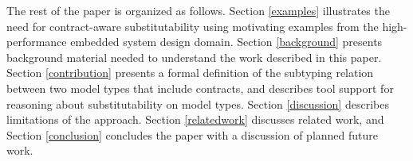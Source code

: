The rest of the paper is organized as follows. 
Section \ref{examples} illustrates the need for contract-aware substitutability using motivating examples from the high-performance 
embedded system design domain.
Section \ref{background} presents background material needed to understand the work described in this paper.
Section \ref{contribution} presents a formal definition  of the subtyping relation between two model types that include contracts, 
and describes tool support for reasoning about substitutability on model types.
Section \ref{discussion} describes limitations of the approach.
Section \ref{relatedwork} discusses related work, and Section \ref{conclusion} concludes the paper with a discussion of planned future work. 
